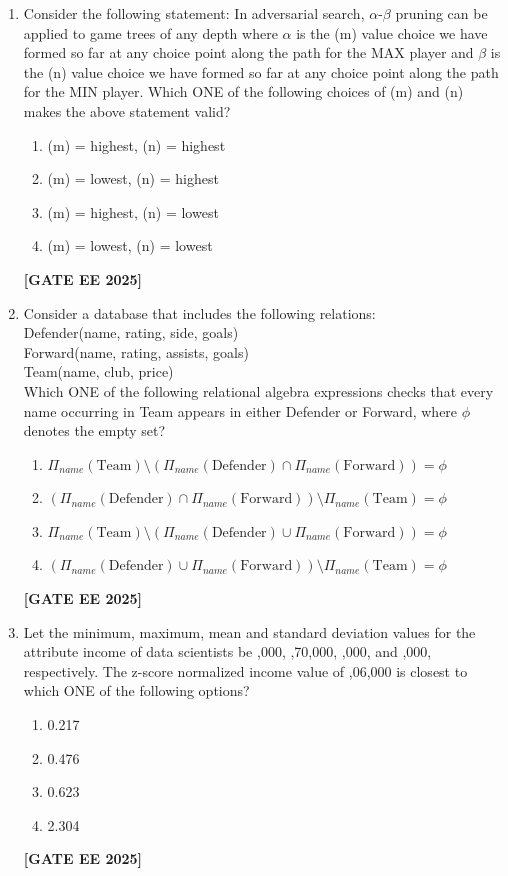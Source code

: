 \documentclass[journal]{IEEEtran}
\newcommand{\qfooter}{%
  \begin{flushright}\footnotesize\textbf{[GATE EE 2025]}\end{flushright}\vspace{1em}%
}
\begin{document}
\begin{enumerate}[leftmargin=*,label=\arabic*.]
\item Consider the following statement: In adversarial search, $\alpha$-$\beta$ pruning can be applied to game trees of any depth where $\alpha$ is the (m) value choice we have formed so far at any choice point along the path for the MAX player and $\beta$ is the (n) value choice we have formed so far at any choice point along the path for the MIN player. Which ONE of the following choices of (m) and (n) makes the above statement valid?
\begin{multicols}{2}
\begin{enumerate}[label=(\Alph*)]
\item (m) = highest, (n) = highest
\item (m) = lowest, (n) = highest
\item (m) = highest, (n) = lowest
\item (m) = lowest, (n) = lowest
\end{enumerate} \qfooter
\end{multicols}

\item Consider a database that includes the following relations:\\
Defender(name, rating, side, goals)\\
Forward(name, rating, assists, goals)\\
Team(name, club, price)\\
Which ONE of the following relational algebra expressions checks that every name occurring in Team appears in either Defender or Forward, where $\phi$ denotes the empty set?

\begin{enumerate}[label=(\Alph*)]
\item $\Pi_{name}(\text{Team}) \setminus (\Pi_{name}(\text{Defender}) \cap \Pi_{name}(\text{Forward})) = \phi$
\item $(\Pi_{name}(\text{Defender}) \cap \Pi_{name}(\text{Forward})) \setminus \Pi_{name}(\text{Team}) = \phi$
\item $\Pi_{name}(\text{Team}) \setminus (\Pi_{name}(\text{Defender}) \cup \Pi_{name}(\text{Forward})) = \phi$
\item $(\Pi_{name}(\text{Defender}) \cup \Pi_{name}(\text{Forward})) \setminus \Pi_{name}(\text{Team}) = \phi$
\end{enumerate} \qfooter


\item Let the minimum, maximum, mean and standard deviation values for the attribute income of data scientists be ,000, ,70,000, ,000, and ,000, respectively. The z-score normalized income value of ,06,000 is closest to which ONE of the following options?
\begin{multicols}{2}
\begin{enumerate}[label=(\Alph*)]
\item 0.217
\item 0.476
\item 0.623
\item 2.304
\end{enumerate} \qfooter
\end{multicols}


\end{enumerate}
\end{document}
